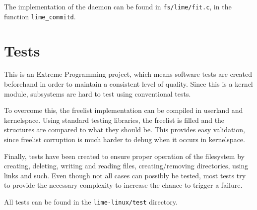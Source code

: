 The implementation of the daemon can be found in \texttt{fs/lime/fit.c}, in the function \texttt{lime\_commitd}.

\section{Tests}

This is an Extreme Programming project, which means software tests are created beforehand in order to maintain a consistent level of quality. Since this is a kernel module, subsystems are hard to test using conventional tests.

To overcome this, the freelist implementation can be compiled in userland and kernelspace. Using standard testing libraries, the freelist is filled and the structures are compared to what they should be. This provides easy validation, since freelist corruption is much harder to debug when it occurs in kernelspace.

Finally, tests have been created to ensure proper operation of the filesystem by creating, deleting, writing and reading files, creating/removing directories, using links and such. Even though not all cases can possibly be tested, most tests try to provide the necessary complexity to increase the chance to trigger a failure.

All tests can be found in the \texttt{lime-linux/test} directory.
